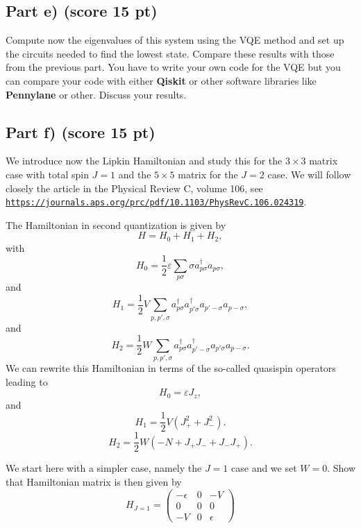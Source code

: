 \documentclass[%
oneside,                 %
final,                   %
10pt]{article}
\begin{document}
\subsection{Part e) (score 15 pt)}

Compute now the eigenvalues of this system using the VQE method and
set up the circuits needed to find the lowest state. Compare these
results with those from the previous part.
You have to write your own code for the VQE but you can compare your code
with either \textbf{Qiskit} or other software libraries like \textbf{Pennylane} or other.
Discuss your results.

\subsection{Part f) (score 15 pt)}

We introduce now the Lipkin Hamiltonian and study this for the
$3\times 3$ matrix case with total spin $J=1$ and the $5\times 5$
matrix for the $J=2$ case.
We will follow closely the article in the Physical Review C, volume 106, see \href{{https://journals.aps.org/prc/pdf/10.1103/PhysRevC.106.024319}}{\nolinkurl{https://journals.aps.org/prc/pdf/10.1103/PhysRevC.106.024319}}.

The Hamiltonian in second quantization is given by
\[
H = H_0 + H_1 +H_2,
\]
with 
\[
H_0 = \frac{1}{2} \varepsilon \sum_{p\sigma}\sigma a_{p\sigma}^{\dagger}a_{p\sigma},
\]
and
\[
H_1 = \frac{1}{2} V \sum_{p,p',\sigma} a_{p\sigma}^\dagger a_{p'\sigma}^\dagger a_{p'-\sigma} a_{p-\sigma},
\]
and
\[
H_{2} = \frac{1}{2} W \sum_{p,p',\sigma}a_{p\sigma}^\dagger a_{p'-\sigma}^\dagger a_{p'\sigma}a_{p-\sigma}.
\]
We can rewrite this Hamiltonian in terms of the so-called quasispin operators leading to
\begin{equation}
H_0 = \varepsilon J_z,
\end{equation}
and
\begin{equation}
H_1 = \frac{1}{2} V \left( J_+^2 + J_-^2 \right).
\end{equation}
\begin{equation}
H_2 = \frac{1}{2} W \left( -N + J_+ J_- + J_- J_+ \right).
\end{equation}

We start here with a simpler case, namely the $J=1$ case and we set $W=0$. Show that Hamiltonian matrix is then given by
\begin{equation}
H_{J = 1} =
\begin{pmatrix}-\epsilon & 0 & -V\\
 0&0&0\\
 -V&0&\epsilon
\end{pmatrix}
\end{equation}
\end{document}
